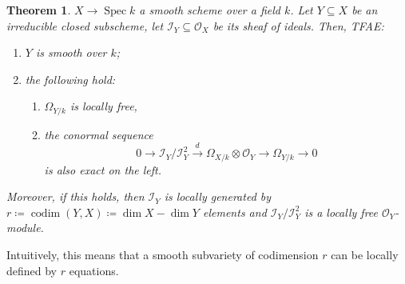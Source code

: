 \documentclass[12pt]{article}
\DeclareMathOperator{\Spec}{Spec}
\DeclareMathOperator{\codim}{codim}
\newtheorem*{theorem}{Theorem}
\theoremstyle{definition}
\begin{document}
\begin{theorem}
$X\rightarrow\Spec k$ a smooth scheme over a field $k$. Let $Y\subseteq X$ be an irreducible closed subscheme, let $\mathcal{I}_Y\subseteq\mathcal{O}_X$ be its sheaf of ideals. Then, TFAE:
\begin{enumerate}[label=\arabic*)]
\item $Y$ is smooth over $k$;
\item\label{sub_smooth} the following hold:
\begin{enumerate}[label=\alph*)]
\item\label{sub_free} $\Omega_{Y/k}$ is locally free,
\item\label{sub_cunumi} the conormal sequence
\[0\longrightarrow\mathcal{I}_Y/\mathcal{I}_Y^2\overset{d}{\longrightarrow}\Omega_{X/k}\otimes\mathcal{O}_Y\longrightarrow\Omega_{Y/k}\longrightarrow0\]
is also exact on the left.
\end{enumerate}
\end{enumerate}

Moreover, if this holds, then $\mathcal{I}_Y$ is locally generated by $r\coloneqq\codim(Y,X)\coloneqq\dim X-\dim Y$ elements and $\mathcal{I}_Y/\mathcal{I}_Y^2$ is a locally free $\mathcal{O}_Y$-module.
\end{theorem}

Intuitively, this means that a smooth subvariety of codimension $r$ can be locally defined by $r$ equations.
\end{document}
